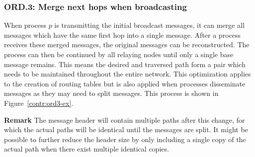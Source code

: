 \subsubsection{ORD.3: Merge next hops when broadcasting}
When process $p$ is transmitting the initial broadcast messages, it can merge all messages which have the same first hop into a single message. After a process receives these merged messages, the original messages can be reconstructed. The process can then be continued by all relaying nodes until only a single base message remains. This means the desired and traversed path form a pair which needs to be maintained throughout the entire network. This optimization applies to the creation of routing tables but is also applied when processes disseminate messages as they may need to split messages. This process is shown in Figure~\ref{contr:ord3-ex}.

\textbf{Remark}
The message header will contain multiple paths after this change, for which the actual paths will be identical until the messages are split. It might be possible to further reduce the header size by only including a single copy of the actual path when there exist multiple identical copies.

